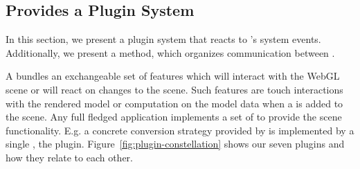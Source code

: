 \documentclass[../03-Architecture.tex]{subfiles}
\begin{document}





\subsection{{\convertify} Provides a Plugin System}
\label{sec:plugin-system}


In this section, we present a plugin system that reacts to
{\convertify}'s system events. Additionally, we present a
method, which organizes communication between
.


A  bundles an exchangeable set of features which will
interact with the WebGL scene or will react on changes to the scene.
Such features are touch interactions with the rendered model or
computation on the model data when a  is added to the
scene. Any full fledged application implements a set of
 to provide the scene functionality. E.g. a concrete
conversion strategy provided by {\platener} is implemented by a single
, the  plugin.
Figure~\ref{fig:plugin-constellation} shows our seven plugins and how
they relate to each other.
\end{document}
